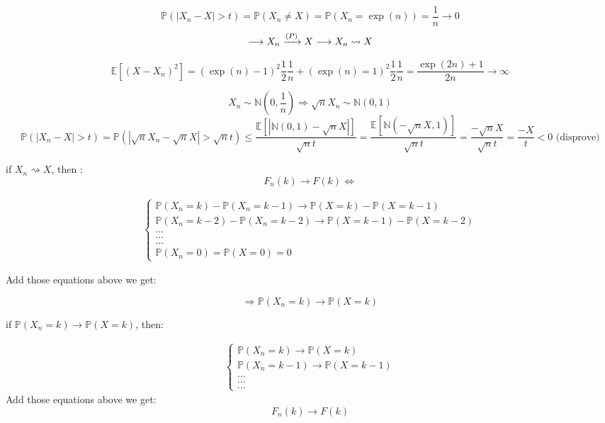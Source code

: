 \documentclass[10pt]{article}
\newenvironment{problem}[2][Problem]{\begin{trivlist}
\item[\hskip \labelsep {\bfseries #1}\hskip \labelsep {\bfseries #2.}]}{\end{trivlist}}
\begin{document}
\begin{problem}{9}



\[\mathbb{P}(|X_n- X| > t)= \mathbb{P}(X_n \neq X)=\mathbb{P}(X_n=\exp(n))=\frac{1}{n} \longrightarrow 0\]
\[\longrightarrow X_n \xrightarrow[]{\text(P)} X \longrightarrow X_n \rightsquigarrow X\]

\[\mathbb{E}[(X-X_n)^2]=(\exp(n)-1)^2\frac{1}{2}\frac{1}{n}+(\exp(n)=1)^2\frac{1}{2}\frac{1}{n}= \frac{\exp(2n)+1}{2n} \rightarrow \infty \]
\end{problem}


\begin{problem}{11}



\[X_n \sim \mathbb{N}(0, \frac{1}{n}) \Rightarrow \sqrt{n}X_n \sim \mathbb{N}(0,1) \]
\[\mathbb{P}(|X_n-X| > t)=\mathbb{P}(|\sqrt{n}X_n -\sqrt{n}X| > \sqrt{n}t) \leqslant \frac{\mathbb{E}[|\mathbb{N}(0,1)-\sqrt{n}X|]}{\sqrt{n}t}= \frac{\mathbb{E}[\mathbb{N}(-\sqrt{n}X, 1)]}{\sqrt{n}t}=\frac{-\sqrt{n}X}{\sqrt{n}t}= \frac{-X}{t} < 0 \text{ (disprove)} \]
\end{problem}

\begin{problem}{12}

if $X_n \rightsquigarrow X$, then :
\[F_n(k)\rightarrow F(k) \Leftrightarrow \]

\begin{align}
    \begin{cases}
        \mathbb{P}(X_n=k) - \mathbb{P}(X_n=k-1) \rightarrow \mathbb{P}(X=k) - \mathbb{P}(X=k-1) \\
        \mathbb{P}(X_n=k-2) - \mathbb{P}(X_n=k-2) \rightarrow  \mathbb{P}(X=k-1) - \mathbb{P}(X=k-2) \\
        \text{...}\\
        \text{...}\\
        \text{...}\\
        \mathbb{P}(X_n=0)=\mathbb{P}(X=0)=0
    \end{cases}
\end{align}

Add those equations above we get: 

\[\Rightarrow \mathbb{P}(X_n=k) \rightarrow \mathbb{P}(X=k)\]


if $\mathbb{P}(X_n=k) \rightarrow \mathbb{P}(X=k)$, then:

\begin{align}
    \begin{cases}
        \mathbb{P}(X_n=k)  \rightarrow \mathbb{P}(X=k)  \\
        \mathbb{P}(X_n=k-1)  \rightarrow  \mathbb{P}(X=k-1)  \\
        \text{...}\\
        \text{...}\\
        \text{...}
    \end{cases}
\end{align}
Add those equations above we get:
\[F_n(k)\rightarrow F(k)  \]

\end{problem}
\end{document}
